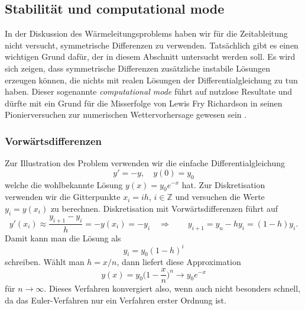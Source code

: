 %
%
%
\subsection{Stabilität und computational mode
\label{pde:subsection:stabilitaet}}
In der Diskussion des Wärmeleitungsproblems haben wir für die Zeitableitung
nicht versucht, symmetrische Differenzen zu verwenden.
Tatsächlich gibt es einen wichtigen Grund dafür, der in diesem Abschnitt
untersucht werden soll.
Es wird sich zeigen, dass symmetrische Differenzen zusätzliche instabile
Lösungen erzeugen können, die nichts mit realen Lösungen der
Differentialgleichung zu tun haben.
%
%
Dieser sogenannte {\em computational mode}
%
führt auf nutzlose Resultate und dürfte mit ein Grund für die Misserfolge
von Lewis Fry Richardson in seinen Pionierversuchen zur numerischen
Wettervorhersage gewesen sein
\cite{buch:richardson}.
%
%

\subsubsection{Vorwärtsdifferenzen}
Zur Illustration des Problem verwenden wir die einfache Differentialgleichung
\[
y' = -y,\quad y(0)=y_0
\]
welche die wohlbekannte Lösung $y(x)=y_0e^{-x}$ hat.
Zur Diskretisation verwenden wir die Gitterpunkte $x_i=ih$, $i\in\mathbb Z$
und versuchen die Werte $y_i = y(x_i)$ zu berechnen.
Diskretisation mit Vorwärtsdifferenzen führt auf 
%
\[
y'(x_i) \approx \frac{y_{i+1}-y_i}{h} = -y(x_i) = -y_i
\quad\Rightarrow\qquad
y_{i+1} = y_u-hy_i = (1-h)y_i.
\]
Damit kann man die Lösung als 
\[
y_i = y_0(1-h)^i
\]
schreiben.
Wählt man $h=x/n$, dann liefert diese Approximation
\[
y(x) = y_0\biggl(1-\frac{x}n\biggr)^n 
\to
y_0e^{-x}
\]
für $n\to\infty$.
Dieses Verfahren konvergiert also, wenn auch nicht besonders schnell,
da das Euler-Verfahren nur ein Verfahren erster Ordnung ist.
%

